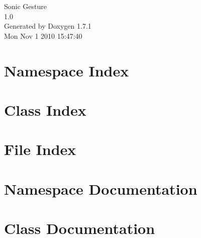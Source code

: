 \documentclass[a4paper]{book}
\begin{document}
\hypersetup{pageanchor=false}
\begin{titlepage}
\vspace*{7cm}
\begin{center}
{\Large Sonic Gesture \\[1ex]\large 1.0 }\\
\vspace*{1cm}
{\large Generated by Doxygen 1.7.1}\\
\vspace*{0.5cm}
{\small Mon Nov 1 2010 15:47:40}\\
\end{center}
\end{titlepage}
\clearemptydoublepage
{}
\tableofcontents
\clearemptydoublepage
{}
\hypersetup{pageanchor=true}
\chapter{Namespace Index}

\chapter{Class Index}

\chapter{File Index}

\chapter{Namespace Documentation}

\chapter{Class Documentation}




















\end{document}

